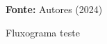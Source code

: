 \documentclass[brazil,msc]{ppgpi-abntex2}
\newcommand{\fonte}[1]{\par\small\textbf{Fonte:} #1}
\begin{document}
\begin{landscape}
\begin{figure}[H]
  \centering
  \caption{Fluxograma teste}
  \fonte{Autores (2024)}
  \label{fig:test}
\end{figure}
\end{landscape}
\end{document}
